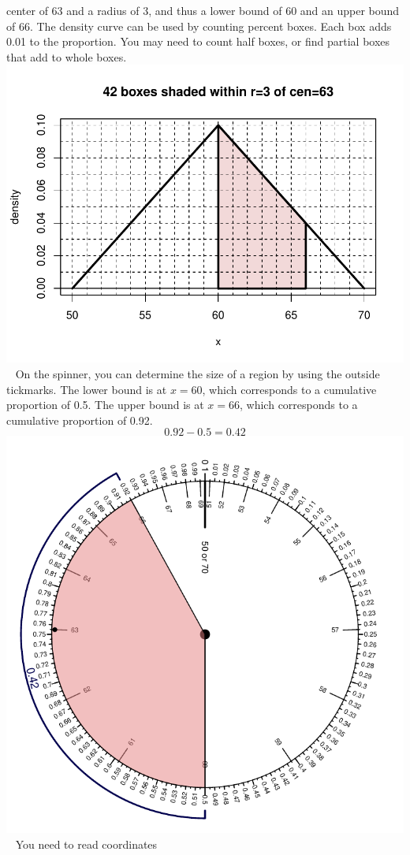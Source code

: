 \begin{solution}
\begin{answerlist}
center of 63 and a radius of 3, and thus a lower bound of 60 and an
upper bound of 66. The density curve can be used by counting percent
boxes. Each box adds 0.01 to the proportion. You may need to count half
boxes, or find partial boxes that add to whole boxes.
\includegraphics{unnamed-chunk-20-1.pdf} ~ On the spinner, you can
determine the size of a region by using the outside tickmarks. The lower
bound is at \(x=60\), which corresponds to a cumulative proportion of
0.5. The upper bound is at \(x=66\), which corresponds to a cumulative
proportion of 0.92. \[0.92-0.5=0.42\]
\includegraphics{unnamed-chunk-21-1.pdf} ~ You need to read coordinates

\end{answerlist}
\end{solution}
